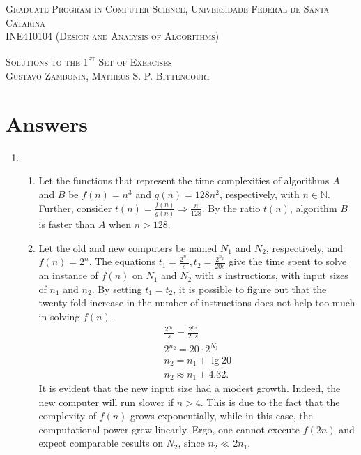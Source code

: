 \documentclass[12pt]{article}
\begin{document}
\textsc{Graduate Program in Computer Science,
  Universidade Federal de Santa Catarina} \\
\textsc{INE410104 (Design and Analysis of Algorithms)}

\textsc{Solutions to the 1\textsuperscript{st} Set of Exercises} \\
\textsc{Gustavo Zambonin, Matheus S. P. Bittencourt}

\section{Answers}

\begin{enumerate}
    \item 
    \begin{enumerate}
        \item Let the functions that represent the time complexities of algorithms $A$ and $B$ be $f(n) = n^{3}$ and $g(n) = 128n^{2}$, respectively, with $n \in \mathbb{N}$. Further, consider $t(n) = \frac{f(n)}{g(n)} \Rightarrow \frac{n}{128}$. By the ratio $t(n)$, algorithm $B$ is faster than $A$ when $n > 128$.
        \item Let the old and new computers be named $N_{1}$ and $N_{2}$, respectively, and $f(n) = 2^{n}$. The equations $t_{1} = \frac{2^{n_{1}}}{s}, t_{2} = \frac{2^{n_{2}}}{20s}$ give the time spent to solve an instance of $f(n)$ on $N_{1}$ and $N_{2}$ with $s$ instructions, with input sizes of $n_{1}$ and $n_{2}$. By setting $t_{1} = t_{2}$, it is possible to figure out that the twenty-fold increase in the number of instructions does not help too much in solving $f(n)$.
        \begin{align*}
            \tfrac{2^{n_{1}}}{s} = \tfrac{2^{n_{2}}}{20s} \\
            2^{n_{2}} = 20 \cdot 2^{N_{1}} \\
            n_{2} = n_{1} + \lg 20 \\
            n_{2} \approx n_{1} + 4.32.
        \end{align*}
        It is evident that the new input size had a modest growth. Indeed, the new computer will run slower if $n > 4$. This is due to the fact that the complexity of $f(n)$ grows exponentially, while in this case, the computational power grew linearly. Ergo, one cannot execute $f(2n)$ and expect comparable results on $N_{2}$, since $n_{2} \ll 2 n_{1}$.
        

\end{enumerate}
\end{enumerate}
\end{document}

